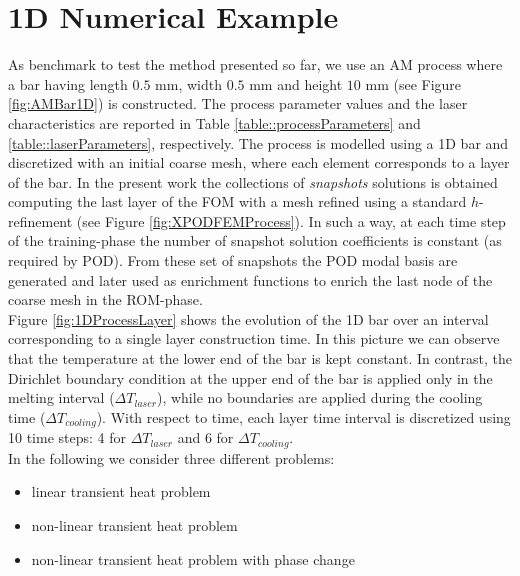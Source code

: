 \documentclass[3p]{article}
\begin{document}

\section*{1D Numerical Example}
As benchmark to test the method presented so far, we use an AM process where a bar having length $0.5$ mm, width $0.5$ mm and height $10$ mm (see Figure \ref{fig:AMBar1D}) is constructed. The process parameter values and the laser characteristics are reported in Table \ref{table::processParameters} and \ref{table::laserParameters}, respectively. The process is modelled using a 1D bar and discretized with an initial coarse mesh, where each element corresponds to a layer of the bar. In the present work the collections of \textit{snapshots} solutions is obtained computing the last layer of the FOM with a mesh refined using a standard $h$-refinement (see Figure \ref{fig:XPODFEMProcess}). In such a way, at each time step of the training-phase the number of snapshot solution coefficients is constant (as required by POD). From these set of snapshots the POD modal basis are generated and later used as enrichment functions to enrich the last node of the coarse mesh in the ROM-phase. 
\\ \indent Figure \ref{fig:1DProcessLayer} shows the evolution of the 1D bar over an interval corresponding to a single layer construction time. In this picture we can observe that the temperature at the lower end of the bar is kept constant. In contrast, the Dirichlet boundary condition at the upper end of the bar is applied only in the melting interval ($\Delta T_{laser}$), while no boundaries are applied during the cooling time ($\Delta T_{cooling}$). With respect to time, each layer time interval is discretized using 10 time steps: 4 for $\Delta T_{laser}$ and 6 for $\Delta T_{cooling}$. \\ In the following we consider three different problems:
\begin{itemize}
\item linear transient heat problem
\item non-linear transient heat problem
\item non-linear transient heat problem with phase change
\end{itemize}
\end{document}
